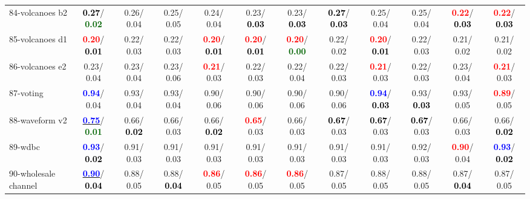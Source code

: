 \begin{table}[h]
\begin{center}
{\begin{tabular}{lc|c|c|c|c|c|c|c|c|c|c}
84-volcanoes b2 & \textcolor{black}{\textbf{  0.27}}/\textcolor{darkgreen}{\textbf{  0.02}} &   0.26/  0.04 &   0.25/  0.05 &   0.24/  0.04 &   0.23/\textcolor{black}{\textbf{  0.03}} &   0.23/\textcolor{black}{\textbf{  0.03}} & \textcolor{black}{\textbf{  0.27}}/\textcolor{black}{\textbf{  0.03}} &   0.25/  0.04 &   0.25/  0.04 & \textcolor{red}{\textbf{  0.22}}/\textcolor{black}{\textbf{  0.03}} & \textcolor{red}{\textbf{  0.22}}/\textcolor{black}{\textbf{  0.03}} \\
85-volcanoes d1 & \textcolor{red}{\textbf{  0.20}}/\textcolor{black}{\textbf{  0.01}} &   0.22/  0.03 &   0.22/  0.03 & \textcolor{red}{\textbf{  0.20}}/\textcolor{black}{\textbf{  0.01}} & \textcolor{red}{\textbf{  0.20}}/\textcolor{black}{\textbf{  0.01}} & \textcolor{red}{\textbf{  0.20}}/\textcolor{darkgreen}{\textbf{  0.00}} &   0.22/  0.02 & \textcolor{red}{\textbf{  0.20}}/\textcolor{black}{\textbf{  0.01}} &   0.22/  0.03 &   0.21/  0.02 &   0.21/  0.02 \\ \hline
86-volcanoes e2 &   0.23/  0.04 &   0.23/  0.04 &   0.23/  0.06 & \textcolor{red}{\textbf{  0.21}}/  0.03 &   0.22/  0.03 &   0.22/  0.04 &   0.22/  0.03 & \textcolor{red}{\textbf{  0.21}}/  0.03 &   0.22/  0.03 &   0.23/  0.04 & \textcolor{red}{\textbf{  0.21}}/  0.03 \\
87-voting & \textcolor{blue}{\textbf{  0.94}}/  0.04 &   0.93/  0.04 &   0.93/  0.04 &   0.90/  0.06 &   0.90/  0.06 &   0.90/  0.06 &   0.90/  0.06 & \textcolor{blue}{\textbf{  0.94}}/\textcolor{black}{\textbf{  0.03}} &   0.93/\textcolor{black}{\textbf{  0.03}} &   0.93/  0.05 & \textcolor{red}{\textbf{  0.89}}/  0.05 \\
88-waveform v2 & \underline{\textcolor{blue}{\textbf{  0.75}}}/\textcolor{darkgreen}{\textbf{  0.01}} &   0.66/\textcolor{black}{\textbf{  0.02}} &   0.66/  0.03 &   0.66/\textcolor{black}{\textbf{  0.02}} & \textcolor{red}{\textbf{  0.65}}/  0.03 &   0.66/  0.03 & \textcolor{black}{\textbf{  0.67}}/  0.03 & \textcolor{black}{\textbf{  0.67}}/  0.03 & \textcolor{black}{\textbf{  0.67}}/  0.03 &   0.66/  0.03 &   0.66/\textcolor{black}{\textbf{  0.02}} \\
89-wdbc & \textcolor{blue}{\textbf{  0.93}}/\textcolor{black}{\textbf{  0.02}} &   0.91/  0.03 &   0.91/  0.03 &   0.91/  0.03 &   0.91/  0.03 &   0.91/  0.03 &   0.91/  0.03 &   0.91/  0.03 &   0.92/  0.03 & \textcolor{red}{\textbf{  0.90}}/  0.04 & \textcolor{blue}{\textbf{  0.93}}/\textcolor{black}{\textbf{  0.02}} \\
90-wholesale channel & \underline{\textcolor{blue}{\textbf{  0.90}}}/\textcolor{black}{\textbf{  0.04}} &   0.88/  0.05 &   0.88/\textcolor{black}{\textbf{  0.04}} & \textcolor{red}{\textbf{  0.86}}/  0.05 & \textcolor{red}{\textbf{  0.86}}/  0.05 & \textcolor{red}{\textbf{  0.86}}/  0.05 &   0.87/  0.05 &   0.88/  0.05 &   0.88/  0.05 &   0.87/\textcolor{black}{\textbf{  0.04}} &   0.87/  0.05 \\

\end{tabular}}
\end{center}
\end{table}
